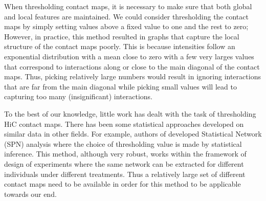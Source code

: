 \documentclass[a4,center,fleqn]{NAR}
\begin{document}
When thresholding contact maps, it is necessary to
make sure that both global and local features are
maintained. We could consider thresholding the
contact maps by simply setting values above a
fixed value to one and the rest to zero; However,
in practice, this method resulted in graphs that
capture the local structure of the contact maps
poorly. This is because intensities follow an
exponential distribution with a mean close to
zero with a few very larges values that correspond to
interactions along or close to the main diagonal of
the contact maps.  Thus, picking relatively large
numbers would result in ignoring interactions that
are far from the main diagonal while picking small
values will lead to capturing too many (insignificant)
interactions.

To the best of our knowledge, little work has
dealt with the task of thresholding HiC contact maps.
There has been some statistical approaches developed
on similar data in other fields.  For example,
authors of \cite{ginestet2011statistical} developed
Statistical Network (SPN) analysis where the
choice of thresholding value is made by statistical inference.
This method, although very robust, works within
the framework of design of experiments where the
same network can be extracted for different individuals
under different treatments. Thus a relatively large
set of different contact maps need to be available
in order for this method to be applicable towards
our end.
\end{document}
